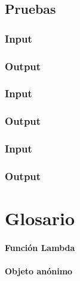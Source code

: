 \documentclass[a4paper]{article}
\begin{document}
\subsection{Pruebas}
\subsubsection{Input}

\subsubsection{Output}


\subsubsection{Input}

\subsubsection{Output}

\subsubsection{Input}

\subsubsection{Output}

\section{Glosario}
\paragraph{Función Lambda}

\paragraph{Objeto anónimo}


\end{document}
